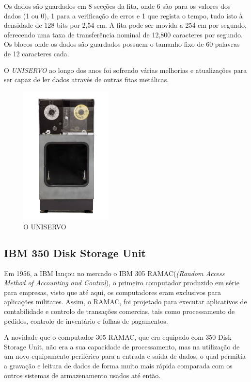 \documentclass{report}
\begin{document}
	Os dados são guardados em 8 secções da fita, onde 6 são para os valores dos dados (1 ou 0), 1 para a verificação de erros e 1 que regista o tempo, tudo isto à densidade de 128 bits por 2,54 cm. A fita pode ser movida a 254 cm por segundo, oferecendo uma taxa de transferência nominal de 12,800 caracteres por segundo. Os blocos onde os dados são guardados possuem o tamanho fixo de 60 palavras de 12 caracteres cada.
\vspace{1mm}
	
	O \textit{UNISERVO}  ao longo dos anos foi sofrendo várias melhorias e atualizações para ser capaz de ler dados através de outras fitas metálicas.

\begin{figure}[h]
		\centering
		\includegraphics[width=4.7cm, height=7cm]{uniservo.jpg}
		\caption{O UNISERVO}
		\end{figure}
	
\newpage
		\subsection{IBM 350 Disk Storage Unit}
		
		Em 1956, a IBM lançou no mercado o IBM 305 RAMAC(\textit{(Random Access Method of Accounting and Control}), o primeiro computador produzido em série para empresas, visto que até aqui, os computadores eram exclusivos para aplicações militares. Assim, o RAMAC, foi projetado para executar aplicativos de contabilidade e controlo de transações comercias, tais como processamento de pedidos, controlo de inventário e folhas de pagamentos.
\vspace{1mm}

		A novidade que o computador 305 RAMAC, que era equipado com 350 Disk Storage Unit, não era a sua capacidade de processamento, mas na utilização de um novo equipamento periférico para a entrada e saída de dados, o qual permitia a gravação e leitura de dados de forma muito mais rápida comparada com os outros sistemas de armazenamento usados até então.
\vspace{1mm}
		
\end{document}
